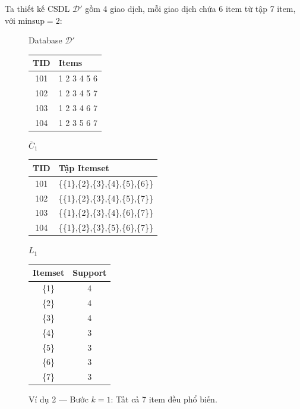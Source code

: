 Ta thiết kế CSDL $\mathcal{D}'$ gồm 4 giao dịch, mỗi giao dịch chứa 6 item từ tập 7 item, với $\text{minsup} = 2$:

\begin{figure}[htbp]
    \centering
    \renewcommand{\arraystretch}{1.2}

    \begin{minipage}[t]{0.22\textwidth}
        \centering
        Database $\mathcal{D}'$\\[4pt]
        \begin{tabular}{|c|l|}
        \hline
        TID & Items \\ \hline
        101 & 1 2 3 4 5 6 \\
        102 & 1 2 3 4 5 7 \\
        103 & 1 2 3 4 6 7 \\
        104 & 1 2 3 5 6 7 \\ \hline
        \end{tabular}
    \end{minipage}
    \hfill
    \begin{minipage}[t]{0.45\textwidth}
        \centering
        $\overline{C}_1$\\[4pt]
        \begin{tabular}{|c|l|}
        \hline
        TID & Tập Itemset \\ \hline
        101 & \{\{1\},\{2\},\{3\},\{4\},\{5\},\{6\}\} \\
        102 & \{\{1\},\{2\},\{3\},\{4\},\{5\},\{7\}\} \\
        103 & \{\{1\},\{2\},\{3\},\{4\},\{6\},\{7\}\} \\
        104 & \{\{1\},\{2\},\{3\},\{5\},\{6\},\{7\}\} \\ \hline
        \end{tabular}
    \end{minipage}
    \hfill
    \begin{minipage}[t]{0.25\textwidth}
        \centering
        $L_1$\\[4pt]
        \begin{tabular}{|c|c|}
        \hline
        Itemset & Support \\ \hline
        \{1\} & 4 \\
        \{2\} & 4 \\
        \{3\} & 4 \\
        \{4\} & 3 \\
        \{5\} & 3 \\
        \{6\} & 3 \\
        \{7\} & 3 \\ \hline
        \end{tabular}
    \end{minipage}

    \caption{Ví dụ 2 --- Bước $k=1$: Tất cả 7 item đều phổ biến.}
    \label{fig:example-2-k1}
\end{figure}

